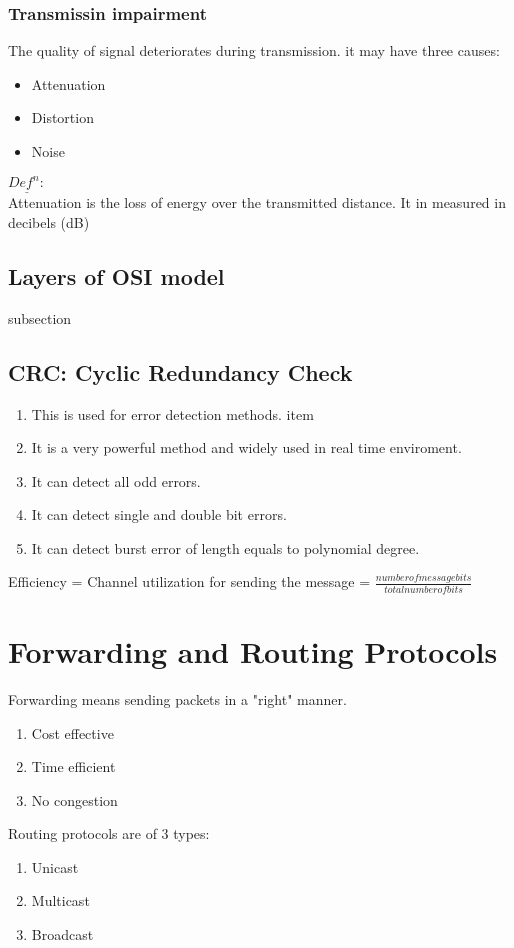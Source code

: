 \documentclass[11pt,letterpaper]{article}
\newenvironment{definition}
	{\begin{mdframed}$\underline{\textit{Def}^\textit{n}:} $\\}
	{\end{mdframed}}
\begin{document}
\subsubsection{Transmissin impairment}
The quality of signal deteriorates during transmission. it may have three causes:
\begin{itemize}
  \item Attenuation
  \item Distortion
  \item Noise
\end{itemize}

\begin{definition}
   Attenuation is the loss of energy over the transmitted distance. It in measured in decibels (dB)
\end{definition}
\subsection{Layers of OSI model}subsection

\subsection{CRC: Cyclic Redundancy Check}
\begin{enumerate}
  \item This is used for error detection methods. item
  \item It is a very powerful method and widely used in real time enviroment. 
  \item It can detect all odd errors. 
  \item It can detect single and double bit errors. 
  \item It can detect burst error of length equals to polynomial degree. 
\end{enumerate}

Efficiency = Channel utilization for sending the message = $\frac{number of message bits}{total number of bits}$

\section{Forwarding and Routing Protocols}
Forwarding means sending packets in a "right" manner. 
\begin{enumerate}
  \item Cost effective
  \item Time efficient
  \item No congestion
\end{enumerate}
Routing protocols are of 3 types: 
\begin{enumerate}
  \item Unicast
  \item Multicast
  \item Broadcast
\end{enumerate}
\end{document}

